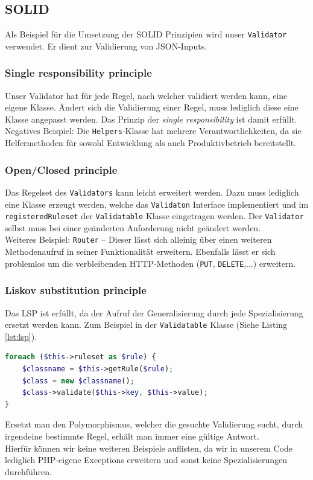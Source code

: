 \documentclass[12pt,a4paper,titlepage,ngerman,pdftex]{report}
\begin{document}
    \subsection{SOLID}
    \label{subsec:solid}
    Als Beispiel für die Umsetzung der SOLID Prinzipien wird unser \verb|Validator| verwendet. Er dient zur Validierung von JSON-Inputs.
    
    \subsubsection{Single responsibility principle}
    Unser Validator hat für jede Regel, nach welcher validiert werden kann, eine eigene Klasse.
    Ändert sich die Validierung einer Regel, muss lediglich diese eine Klasse angepasst werden.
    Das Prinzip der \textit{single responsibility} ist damit erfüllt.
    \\
    Negatives Beispiel: Die \verb|Helpers|-Klasse hat mehrere Verantwortlichkeiten, da sie Helfermethoden für sowohl Entwicklung als auch Produktivbetrieb bereitstellt.

    \subsubsection{Open/Closed principle}
    Das Regelset des \verb|Validators| kann leicht erweitert werden.
    Dazu muss lediglich eine Klasse erzeugt werden, welche das \verb|Validaton| Interface implementiert und im \verb|registeredRuleset| der \verb|Validatable| Klasse eingetragen werden.
    Der \verb|Validator| selbst muss bei einer geänderten Anforderung nicht geändert werden.
    \\
    Weiteres Beispiel: \verb|Router| -- Dieser lässt sich alleinig über einen weiteren Methodenaufruf in seiner Funktionalität erweitern.
    Ebenfalls lässt er sich problemlos um die verbleibenden HTTP-Methoden (\verb|PUT|, \verb|DELETE|,...) erweitern.

    \subsubsection{Liskov substitution principle}
    Das LSP ist erfüllt, da der Aufruf der Generalisierung durch jede Spezialisierung ersetzt werden kann.
    Zum Beispiel in der \verb|Validatable| Klasse (Siehe Listing \ref{lst:lsp}).
    \begin{lstlisting}[language=php,label={lst:lsp},escapechar=\%,caption={Beispiel Liskov substitution principle}]
foreach ($this->ruleset as $rule) {
    $classname = $this->getRule($rule);
    $class = new $classname();
    $class->validate($this->key, $this->value);
}\end{lstlisting}
	Ersetzt man den Polymorphismus, welcher die gesuchte Validierung sucht, durch irgendeine bestimmte Regel, erhält man immer eine gültige Antwort.
    \\
    Hierfür können wir keine weiteren Beispiele auflisten, da wir in unserem Code lediglich PHP-eigene Exceptions erweitern und sonst keine Spezialisierungen durchführen.
\end{document}
